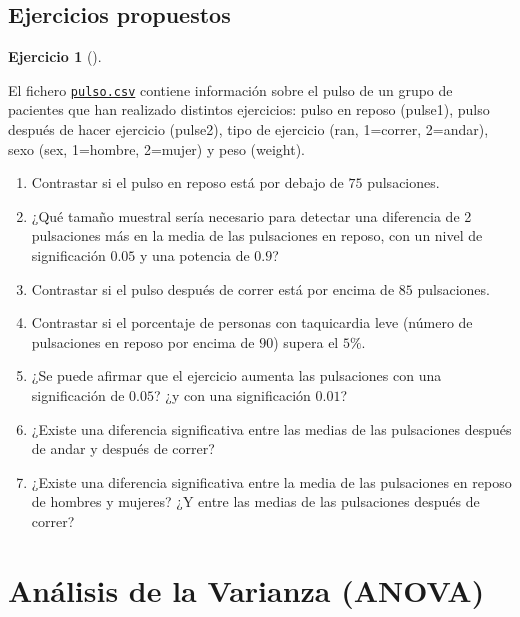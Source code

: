 \documentclass[
  a4paper,
]{scrreport}
\theoremstyle{definition}
\newtheorem{exercise}{Ejercicio}[chapter]
\theoremstyle{remark}
\begin{document}
\section{Ejercicios propuestos}\label{ejercicios-propuestos-7}

\begin{exercise}[]\protect\hypertarget{exr-contraste-hipotesis-pulso}{}\label{exr-contraste-hipotesis-pulso}

El fichero
\href{https://aprendeconalf.es/estadistica-practicas-r/datos/pulso.csv}{\texttt{pulso.csv}}
contiene información sobre el pulso de un grupo de pacientes que han
realizado distintos ejercicios: pulso en reposo (pulse1), pulso después
de hacer ejercicio (pulse2), tipo de ejercicio (ran, 1=correr, 2=andar),
sexo (sex, 1=hombre, 2=mujer) y peso (weight).

\begin{enumerate}
\def\labelenumi{\alph{enumi}.}
\item
  Contrastar si el pulso en reposo está por debajo de \(75\)
  pulsaciones.
\item
  ¿Qué tamaño muestral sería necesario para detectar una diferencia de 2
  pulsaciones más en la media de las pulsaciones en reposo, con un nivel
  de significación \(0.05\) y una potencia de \(0.9\)?
\item
  Contrastar si el pulso después de correr está por encima de \(85\)
  pulsaciones.
\item
  Contrastar si el porcentaje de personas con taquicardia leve (número
  de pulsaciones en reposo por encima de \(90\)) supera el \(5\%\).
\item
  ¿Se puede afirmar que el ejercicio aumenta las pulsaciones con una
  significación de \(0.05\)? ¿y con una significación \(0.01\)?
\item
  ¿Existe una diferencia significativa entre las medias de las
  pulsaciones después de andar y después de correr?
\item
  ¿Existe una diferencia significativa entre la media de las pulsaciones
  en reposo de hombres y mujeres? ¿Y entre las medias de las pulsaciones
  después de correr?
\end{enumerate}

\end{exercise}


\chapter{Análisis de la Varianza
(ANOVA)}\label{anuxe1lisis-de-la-varianza-anova}
\end{document}
